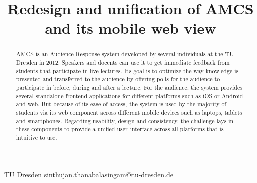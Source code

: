 \documentclass{sigplanconf}
\begin{document}
\setlength{\pdfpageheight}{\paperheight}
\setlength{\pdfpagewidth}{\paperwidth}






\title{Redesign and unification of AMCS and its mobile web view}

           {TU Dresden}
           {sinthujan.thanabalasingam@tu-dresden.de}

\maketitle

\begin{abstract}

AMCS is an Audience Response system developed by several individuals at the TU Dresden in 2012. Speakers and docents can use it to get immediate feedback from students that participate in live lectures. Its goal is to optimize the way knowledge is presented and transferred to the audience by offering polls for the audience to participate in before, during and after a lecture.
For the audience, the system provides several standalone frontend applications for different platforms such as iOS or Android and web. But because of its ease of access, the system is used by the majority of students via its web component across different mobile devices such as laptops, tablets and smartphones. 
Regarding usability, design and consistency, the challenge lays in these components to provide a unified user interface across all platforms that is intuitive to use.
\end{abstract}
\end{document}
